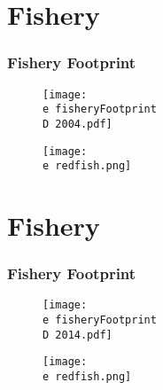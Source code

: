 \documentclass{beamer}
\begin{document}
\section{Fishery}
\begin{frame}
\frametitle{Fishery Footprint}
\vspace*{-0.75cm}

\begin{figure}

 \centerline{\texttt{[image: \\e fisheryFootprint\\D 2004.pdf]}}

 \end{figure}
		\begin{figure}
				\vspace*{-.75cm}
				 \hspace*{5cm} \centerline{\texttt{[image: \\e redfish.png]}} 
				 \vspace*{-1.5cm}
				 \end{figure}
\end{frame}

\section{Fishery}
\begin{frame}
\frametitle{Fishery Footprint}
\vspace*{-0.75cm}

\begin{figure}

 \centerline{\texttt{[image: \\e fisheryFootprint\\D 2014.pdf]}}

 \end{figure}
		\begin{figure}
				\vspace*{-.75cm}
				 \hspace*{5cm} \centerline{\texttt{[image: \\e redfish.png]}} 
				 \vspace*{-1.5cm}
				 \end{figure}
\end{frame}
\end{document}
